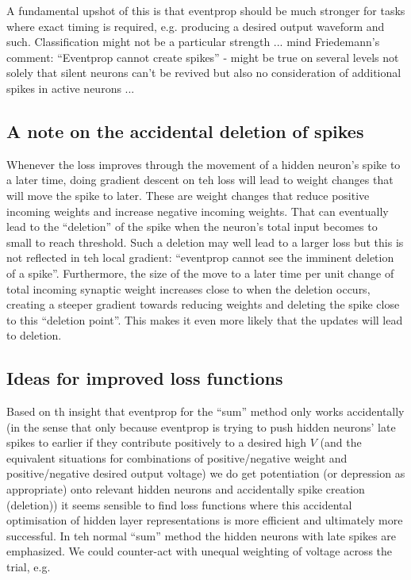 \documentclass[a4paper]{article}
\begin{document}
A fundamental upshot of this is that eventprop should be much stronger for tasks where exact timing is required, e.g. producing a desired output waveform and such. Classification might not be a particular strength ... mind Friedemann's comment: ``Eventprop cannot create spikes'' - might be true on several levels not solely that silent neurons can't be revived but also no consideration of additional spikes in active neurons ...

\subsection{A note on the accidental deletion of spikes}
Whenever the loss improves through the movement of a hidden neuron's
spike to a later time, doing gradient descent on teh loss will lead to weight
changes that will move the spike to later. These are weight changes
that reduce positive incoming weights and increase negative incoming
weights. That can eventually lead to the ``deletion'' of the spike
when the neuron's total input becomes to small to reach
threshold. Such a deletion may well lead to a larger loss but this is
not reflected in teh local gradient: ``eventprop cannot see the
imminent deletion of a spike''. Furthermore, the size of the move to a later time
per unit change of total incoming synaptic weight increases close to
when the deletion occurs, creating a steeper gradient towards reducing
weights and deleting the spike close to this ``deletion point''. This
makes it even more likely that the updates will lead to deletion.

\subsection{Ideas for improved loss functions}
Based on th insight that eventprop for the ``sum'' method only works
accidentally (in the sense that only because eventprop is trying to
push hidden neurons' late spikes to earlier if they contribute
positively to a desired high $V$ (and the equivalent situations for
combinations of positive/negative weight and positive/negative desired
output voltage) we do get potentiation (or depression as appropriate)
onto relevant hidden neurons and accidentally spike creation
(deletion)) it seems sensible to find loss functions where this
accidental optimisation of hidden layer representations is more
efficient and ultimately more successful. In teh normal ``sum'' method
the hidden neurons with late spikes are emphasized. We could
counter-act with unequal weighting of voltage across the trial, e.g.
\begin{align}
\end{align}
\end{document}
